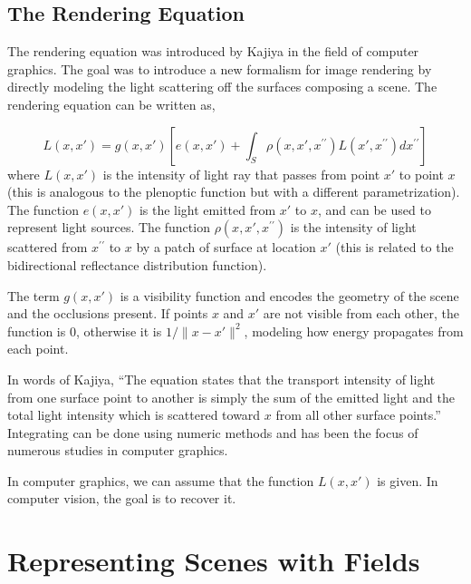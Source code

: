 \subsection{The Rendering Equation}

The rendering equation was introduced by Kajiya \cite{Kajiya1986} in the field of computer graphics. The goal was to introduce a new formalism for image rendering by directly modeling the light scattering off the surfaces composing a scene. The rendering equation can be written as,

\begin{equation}
L(x,x') = g(x,x') \left[ e(x,x') + \int_S \rho(x,x',x^{\prime\prime}) L(x',x^{\prime\prime}) dx^{\prime\prime} \right]
\label{eq:nerf:Kajiya_rendering_equation}
\end{equation}
where $L(x,x')$ is the intensity of light ray that passes from point $x'$ to point $x$ (this is analogous to the plenoptic function but with a different parametrization). The function $e(x,x')$ is the light emitted from $x'$ to $x$, and can be used to represent light sources. The function $\rho(x,x',x^{\prime\prime})$ is the intensity of light scattered from $x^{\prime\prime}$ to $x$ by a patch of surface at location $x'$ (this is related to the bidirectional reflectance distribution function).


The term $g(x, x')$ is a visibility function and encodes the geometry of the scene and the occlusions present. If points $x$ and $x'$ are not visible from each other, the function is 0, otherwise it is $1/\lVert x-x' \rVert ^2$, modeling how energy propagates from each point.  

In words of Kajiya, ``The equation states that the transport intensity of light from one surface point to another is simply the sum of the emitted light and the total light intensity which is scattered toward $x$ from all other surface points.'' Integrating \eqn{\ref{eq:nerf:Kajiya_rendering_equation}} can be done using numeric methods and has been the focus of numerous studies in computer graphics. 

In computer graphics, we can assume that the function $L(x,x')$ is given. In computer vision, the goal is to recover it.


\section{Representing Scenes with Fields}

